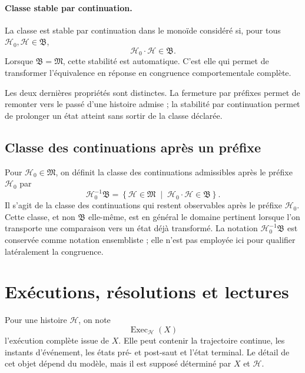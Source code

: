 \paragraph{Classe stable par continuation.}
La classe est stable par continuation dans le monoïde considéré si,
pour tous \(\mathcal H_0,\mathcal H\in\mathfrak B\),
\[
\mathcal H_0\cdot\mathcal H\in\mathfrak B.
\]
Lorsque \(\mathfrak B=\mathfrak M\), cette stabilité est automatique. C'est elle qui permet de transformer l'équivalence en réponse en congruence comportementale complète.

Les deux dernières propriétés sont distinctes. La fermeture par préfixes permet de remonter vers le passé d'une histoire admise ; la stabilité par continuation permet de prolonger un état atteint sans sortir de la classe déclarée.

\subsection{Classe des continuations après un préfixe}
\label{annexe-histoires-continuations-prefixe}

Pour \(\mathcal H_0\in\mathfrak M\), on définit la classe des
continuations admissibles après le préfixe \(\mathcal H_0\) par
\begin{equation}
\label{eq:annexe-G-quotient-gauche}
\mathcal H_0^{-1}\mathfrak B
=
\left\{
\mathcal H\in\mathfrak M
\;\middle|\;
\mathcal H_0\cdot\mathcal H\in\mathfrak B
\right\}.
\end{equation}
Il s'agit de la classe des continuations qui restent observables après
le préfixe \(\mathcal H_0\). Cette classe, et non \(\mathfrak B\)
elle-même, est en général le domaine pertinent lorsque l'on transporte
une comparaison vers un état déjà transformé. La notation
\(\mathcal H_0^{-1}\mathfrak B\) est conservée comme notation ensembliste ;
elle n'est pas employée ici pour qualifier latéralement la congruence.

\section{Exécutions, résolutions et lectures}
\label{annexe-histoires-observation}

Pour une histoire \(\mathcal H\), on note
\[
\operatorname{Exec}_{\mathcal H}(X)
\]
l'exécution complète issue de \(X\). Elle peut contenir la trajectoire
continue, les instants d'événement, les états pré- et post-saut et
l'état terminal. Le détail de cet objet dépend du modèle, mais il est
supposé déterminé par \(X\) et \(\mathcal H\).

